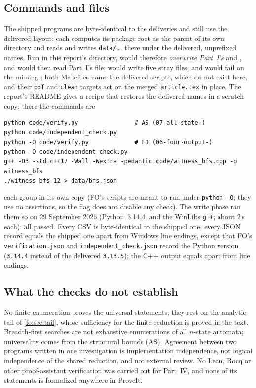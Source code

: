 \documentclass[11pt,a4paper]{article}
\numberwithin{equation}{section}
\theoremstyle{definition}
\theoremstyle{remark}
\begin{document}
\subsection{Commands and files}\label{fo:sec:commands}

The shipped programs are byte-identical to the deliveries and still use the
delivered layout: each computes its package root as the parent of its own
directory and reads and writes \texttt{data/}\ldots\ there under the
delivered, unprefixed names. Run in this report's directory,
 would therefore \emph{overwrite Part~I's}
 and , and
 would then read Part~I's file;
 would write five stray files, and
 would fail on the missing
; both Makefiles name the delivered scripts,
which do not exist here, and their \texttt{pdf} and \texttt{clean} targets act
on the merged \texttt{article.tex} in place. The report's README gives a recipe
that restores the delivered names in a scratch copy; there the commands are
\begin{lstlisting}
python code/verify.py                # AS (07-all-state-)
python code/independent_check.py
python -O code/verify.py             # FO (06-four-output-)
python -O code/independent_check.py
g++ -O3 -std=c++17 -Wall -Wextra -pedantic code/witness_bfs.cpp -o witness_bfs
./witness_bfs 12 > data/bfs.json
\end{lstlisting}
each group in its own copy (FO's scripts are meant to run under
\texttt{python -O}; they use no assertions, so the flag does not disable any
check). The write phase ran them so on 29 September 2026 (Python~3.14.4, and
the WinLibs \texttt{g++}; about $2$\,s each): all passed. Every CSV is
byte-identical to the shipped one; every JSON record equals the shipped one
apart from Windows line endings, except that FO's \texttt{verification.json}
and \texttt{independent\_check.json} record the Python version
(\texttt{3.14.4} instead of the delivered \texttt{3.13.5}); the C++ output
equals  apart from line endings.

\subsection{What the checks do not establish}

No finite enumeration proves the universal statements; they rest on the
analytic tail of \cref{fo:sec:tail}, whose sufficiency for the finite
reduction is proved in the text. Breadth-first searches are not exhaustive
enumerations of all $n$-state automata; universality comes from the
structural bounds (AS). Agreement between two programs written in one
investigation is implementation independence, not logical independence of the
shared reduction, and not external review. No Lean, Rocq or other
proof-assistant verification was carried out for Part~IV, and none of its
statements is formalized anywhere in ProveIt.
\end{document}
